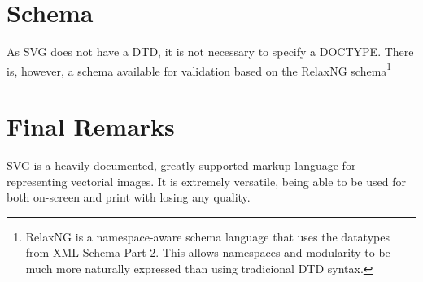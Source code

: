 \documentclass[twocolumn,twoside,10pt,a4paper]{article}
\begin{document}
\section{Schema}

As SVG does not have a DTD, it is not necessary to specify a DOCTYPE. There is, however, a schema available for validation based on the RelaxNG schema\footnote{RelaxNG is a namespace-aware schema language that uses the datatypes from XML Schema Part 2. This allows namespaces and modularity to be much more naturally expressed than using tradicional DTD syntax.}

\section{Final Remarks}

SVG is a heavily documented, greatly supported markup language for representing vectorial images. It is extremely versatile, being able to be used for both on-screen and print with losing any quality.

\renewcommand{\bibname}{Referências}


\end{document}
